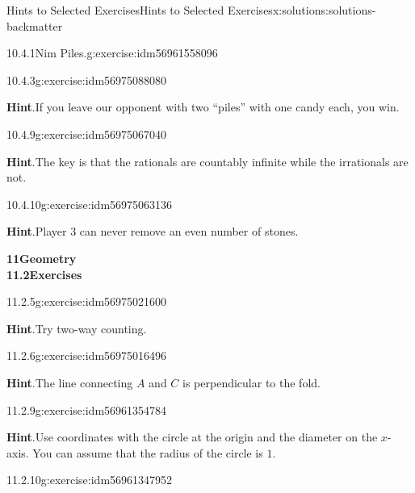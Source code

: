 \documentclass[twoside,10pt,]{book}
\newcommand{\blocktitlefont}{\relax}
\numberwithin{equation}{section}
\begin{document}
\begin{solutions-chapter}{Hints  to Selected Exercises}{}{Hints  to Selected Exercises}{}{}{x:solutions:solutions-backmatter}
\begin{divisionsolution}{10.4.1}{Nim Piles.}{g:exercise:idm56961558096}
\end{divisionsolution}%
\begin{divisionsolution}{10.4.3}{}{g:exercise:idm56975088080}%
\par\smallskip%
\noindent\textbf{\blocktitlefont Hint}.\hypertarget{g:hint:idm56975086224-back}{}\quad{}If you leave our opponent with two ``piles'' with one candy each, you win.%
\end{divisionsolution}%
\begin{divisionsolution}{10.4.9}{}{g:exercise:idm56975067040}%
\par\smallskip%
\noindent\textbf{\blocktitlefont Hint}.\hypertarget{g:hint:idm56975064768-back}{}\quad{}The key is that the rationals are countably infinite while the irrationals are not.%
\end{divisionsolution}%
\begin{divisionsolution}{10.4.10}{}{g:exercise:idm56975063136}%
\par\smallskip%
\noindent\textbf{\blocktitlefont Hint}.\hypertarget{g:hint:idm56975061120-back}{}\quad{}Player 3 can never remove an even number of stones.%
\end{divisionsolution}%
\par\medskip
\noindent\textbf{\Large{}11\space\textperiodcentered\space{}Geometry\\
11.2\space\textperiodcentered\space{}Exercises}
\begin{divisionsolution}{11.2.5}{}{g:exercise:idm56975021600}%
\par\smallskip%
\noindent\textbf{\blocktitlefont Hint}.\hypertarget{g:hint:idm56975017136-back}{}\quad{}Try two-way counting.%
\end{divisionsolution}%
\begin{divisionsolution}{11.2.6}{}{g:exercise:idm56975016496}%
\par\smallskip%
\noindent\textbf{\blocktitlefont Hint}.\hypertarget{g:hint:idm56975011296-back}{}\quad{}The line connecting \(A\) and \(C\) is perpendicular to the fold.%
\end{divisionsolution}%
\begin{divisionsolution}{11.2.9}{}{g:exercise:idm56961354784}%
\par\smallskip%
\noindent\textbf{\blocktitlefont Hint}.\hypertarget{g:hint:idm56961349008-back}{}\quad{}Use coordinates with the circle at the origin and the diameter on the \(x\)-axis.  You can assume that the radius of the circle is \(1\).%
\end{divisionsolution}%
\begin{divisionsolution}{11.2.10}{}{g:exercise:idm56961347952}%

\end{divisionsolution}
\end{solutions-chapter}
\end{document}
